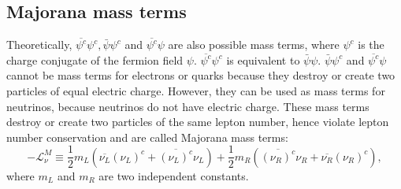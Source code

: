 \subsection{Majorana mass terms}
\label{sec:major}
Theoretically, $\overline{\psi^{c}}\psi^{c}, \bar{\psi}\psi^{c}$ and
$\overline{\psi^{c}}\psi$ are also possible mass terms, where
$\psi^{c}$ is the charge conjugate of the fermion field
$\psi$. $\overline{\psi^{c}} \psi^{c}$ is equivalent to
$\bar{\psi}\psi$. $\bar{\psi}\psi^{c}$ and $\overline{\psi^{c}}\psi$
cannot be mass terms for electrons or quarks because they destroy or
create two particles of equal electric charge. However, they can be
used as mass terms for neutrinos, because neutrinos do not have
electric charge. These mass terms destroy or create two particles of
the same lepton number, hence violate lepton number conservation and
are called Majorana mass terms:
\begin{equation}
\label{eq:mmt}
-\mathcal{L}_{\nu}^{M} \equiv \frac{1}{2}m_{L} \left(
\overline{\nu_{L}}(\nu_{L})^{c} + \overline{(\nu_{L})^{c}}\nu_{L}
\right) + \frac{1}{2}m_{R} \left(
\overline{(\nu_{R})^{c}}\nu_{R} + 
\overline{\nu_{R}}(\nu_{R})^{c} \right),
\end{equation}
where $m_{L}$ and $m_{R}$ are two independent constants. 

